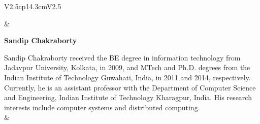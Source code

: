\begin{tabular}{V{2.5}cp{14.3cm}V{2.5}}

 & 

\centerline{\large\bf Sandip Chakraborty}

\bigskip
Sandip Chakraborty received the BE degree in information technology from Jadavpur University, Kolkata, in 2009, and MTech and Ph.D. degrees from the Indian Institute of Technology Guwahati, India, in 2011 and 2014, respectively. Currently, he is an assistant professor with the Department of Computer Science and Engineering, Indian Institute of Technology Kharagpur, India. His research interests include computer systems and distributed computing.\\
&\\
\end{tabular}




